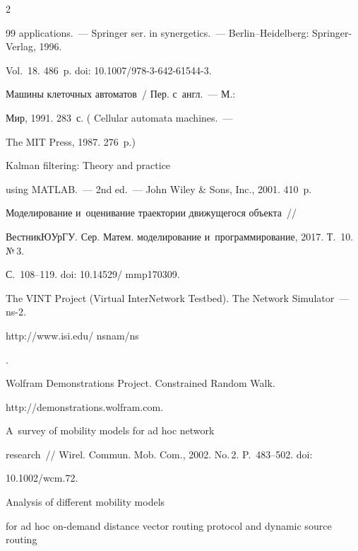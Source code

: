 \begin{multicols}{2}
{{\begin{thebibliography}{99}
applications.~--- Springer ser. in synergetics.~--- Berlin--Heidelberg: Springer-Verlag, 1996. 

Vol.~18. 486~p. doi: 10.1007/978-3-642-61544-3.




 Машины клеточных автоматов~/ Пер. с~англ.~--- М.: 

Мир, 1991. 283~с. ( Cellular automata machines.~--- 

The MIT Press, 1987. 276~p.)


 Kalman filtering: Theory and practice

using MATLAB.~--- 2nd ed.~--- John Wiley \& Sons, Inc., 2001. 410~p.


 Моделирование и~оцени\-ва\-ние траектории движущегося объекта~// 

Вестник\linebreak  ЮУрГУ. Сер. Матем. моделирование и~программирование, 2017. Т.~10. №\,3. 

С.~108--119. doi: 10.14529/ mmp170309.


The VINT Project (Virtual InterNetwork Testbed). The Network Simulator~--- ns-2. {\sf 

http://www.isi.edu/ nsnam/ns}.


Wolfram Demonstrations Project. Constrained Random Walk.

 {\sf http://demonstrations.wolfram.com}.


 A~survey of mobility models for ad hoc network 

research~// Wirel. Commun. Mob. Com., 2002. No.\,2. P.~483--502. doi: 

10.1002/wcm.72.


 Analysis of different mobility models 

for ad hoc on-demand distance vector routing protocol and dynamic source routing 


\end{thebibliography}}}
\end{multicols}
